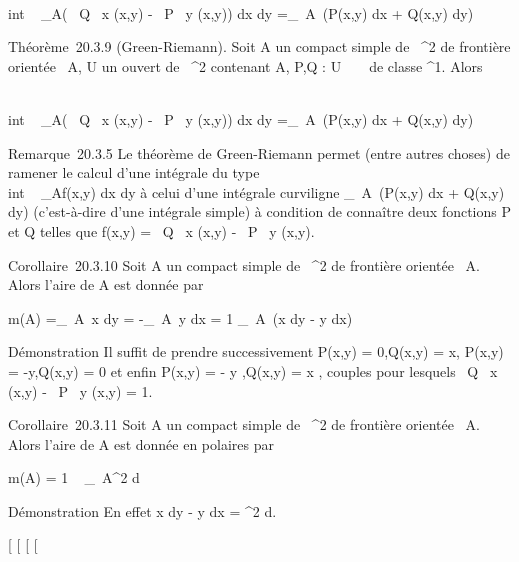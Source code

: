 \documentclass[]{article}
\begin{document}
\int  \\int ~
_A\left ( \partial~Q \over \partial~x (x,y) -
\partial~P \over \partial~y (x,y)\right ) dx dy
=\int  _\partial~A~(P(x,y) dx + Q(x,y) dy)

Théorème~20.3.9 (Green-Riemann). Soit A un compact simple de
~^2 de frontière orientée \partial~A, U un ouvert de ~^2
contenant A, P,Q : U \rightarrow~ ~ de classe ^1. Alors

\int  \\int ~
_A\left ( \partial~Q \over \partial~x (x,y) -
\partial~P \over \partial~y (x,y)\right ) dx dy
=\int  _\partial~A~(P(x,y) dx + Q(x,y) dy)

Remarque~20.3.5 Le théorème de Green-Riemann permet (entre autres
choses) de ramener le calcul d'une intégrale du type
\int  \\int ~
_Af(x,y) dx dy à celui d'une intégrale curviligne
\int  _\partial~A~(P(x,y) dx + Q(x,y) dy)
(c'est-à-dire d'une intégrale simple) à condition de connaître deux
fonctions P et Q telles que f(x,y) = \partial~Q \over \partial~x
(x,y) - \partial~P \over \partial~y (x,y).

Corollaire~20.3.10 Soit A un compact simple de ~^2 de
frontière orientée \partial~A. Alors l'aire de A est donnée par

m(A) =\int  _\partial~A~x dy =
-\int  _\partial~A~y dx = 1
 \int  _\partial~A~(x dy
- y dx)

Démonstration Il suffit de prendre successivement P(x,y) = 0,Q(x,y) = x,
P(x,y) = -y,Q(x,y) = 0 et enfin P(x,y) = - y 
,Q(x,y) = x  , couples pour lesquels  \partial~Q
\over \partial~x (x,y) - \partial~P \over \partial~y (x,y) =
1.

Corollaire~20.3.11 Soit A un compact simple de ~^2 de
frontière orientée \partial~A. Alors l'aire de A est donnée en polaires par

m(A) = 1  \int ~
_\partial~A\rho^2 d\theta

Démonstration En effet x dy - y dx = \rho^2 d\theta.

{[}
{[}
{[}
{[}
\end{document}
